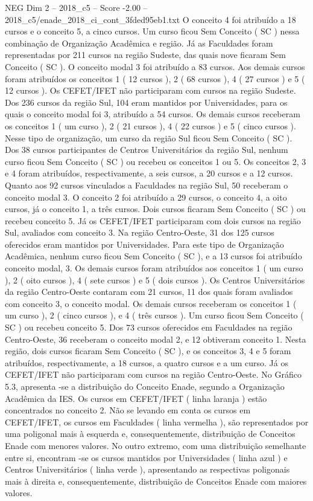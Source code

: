 \begin{textsample}{NEG Dim 2 – 2018\_c5 – Score -2.00 – 2018\_c5/enade\_2018\_ci\_cont\_3fded95eb1.txt}
O conceito 4 foi atribuído a 18 cursos e o conceito 5, a cinco cursos.
Um curso ficou Sem Conceito ( SC ) nessa combinação de Organização Acadêmica e região.
Já as Faculdades foram representadas por 211 cursos na região Sudeste, das quais nove ficaram Sem Conceito ( SC ).
O conceito modal 3 foi atribuído a 83 cursos.
Aos demais cursos foram atribuídos os conceitos 1 ( 12 cursos ), 2 ( 68 cursos ), 4 ( 27 cursos ) e 5 ( 12 cursos ).
Os CEFET/IFET não participaram com cursos na região Sudeste.
Dos 236 cursos da região Sul, 104 eram mantidos por Universidades, para os quais o conceito modal foi 3, atribuído a 54 cursos.
Os demais cursos receberam os conceitos 1 ( um curso ), 2 ( 21 cursos ), 4 ( 22 cursos ) e 5 ( cinco cursos ).
Nesse tipo de organização, um curso da região Sul ficou Sem Conceito ( SC ).
Dos 38 cursos participantes de Centros Universitários da região Sul, nenhum curso ficou Sem Conceito ( SC ) ou recebeu os conceitos 1 ou 5.
Os conceitos 2, 3 e 4 foram atribuídos, respectivamente, a seis cursos, a 20 cursos e a 12 cursos.
Quanto aos 92 cursos vinculados a Faculdades na região Sul, 50 receberam o conceito modal 3.
O conceito 2 foi atribuído a 29 cursos, o conceito 4, a oito cursos, já o conceito 1, a três cursos.
Dois cursos ficaram Sem Conceito ( SC ) ou recebeu conceito 5.
Já os CEFET/IFET participaram com dois cursos na região Sul, avaliados com conceito 3.
Na região Centro-Oeste, 31 dos 125 cursos oferecidos eram mantidos por Universidades.
Para este tipo de Organização Acadêmica, nenhum curso ficou Sem Conceito ( SC ), e a 13 cursos foi atribuído conceito modal, 3.
Os demais cursos foram atribuídos aos conceitos 1 ( um curso ), 2 ( oito cursos ), 4 ( sete cursos ) e 5 ( dois cursos ).
Os Centros Universitários da região Centro-Oeste contaram com 21 cursos, 11 dos quais foram avaliados com conceito 3, o conceito modal.
Os demais cursos receberam os conceitos 1 ( um curso ), 2 ( cinco cursos ), e 4 ( três cursos ).
Um curso ficou Sem Conceito ( SC ) ou recebeu conceito 5.
Dos 73 cursos oferecidos em Faculdades na região Centro-Oeste, 36 receberam o conceito modal 2, e 12 obtiveram conceito 1.
Nesta região, dois cursos ficaram Sem Conceito ( SC ), e os conceitos 3, 4 e 5 foram atribuídos, respectivamente, a 18 cursos, a quatro cursos e a um curso.
Já os CEFET/IFET não participaram com cursos na região Centro-Oeste.
No Gráfico 5.3, apresenta -se a distribuição do Conceito Enade, segundo a Organização Acadêmica da IES.
Os cursos em CEFET/IFET ( linha laranja ) estão concentrados no conceito 2.
Não se levando em conta os cursos em CEFET/IFET, os cursos em Faculdades ( linha vermelha ), são representados por uma poligonal mais à esquerda e, consequentemente, distribuição de Conceitos Enade com menores valores.
No outro extremo, com uma distribuição semelhante entre si, encontram -se os cursos mantidos por Universidades ( linha azul ) e Centros Universitários ( linha verde ), apresentando as respectivas poligonais mais à direita e, consequentemente, distribuição de Conceitos Enade com maiores valores.

\end{textsample}
